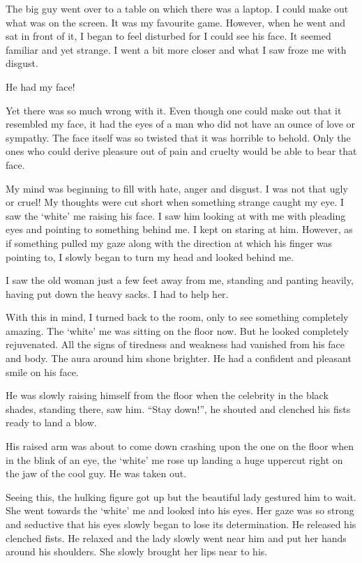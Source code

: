 \documentclass[twoside,11pt,titlepage]{article}
\begin{document}
The big guy went over to a table on which there was a laptop. I could make out what was on the screen. It was my favourite game. However, when he went and sat in front of it, I began to feel disturbed for I could see his face. It seemed familiar and yet strange. I went a bit more closer and what I saw froze me with disgust.

He had my face!

Yet there was so much wrong with it. Even though one could make out that it resembled my face, it had the eyes of a man who did not have an ounce of love or sympathy. The face itself was so twisted that it was horrible to behold. Only the ones who could derive pleasure out of pain and cruelty would be able to bear that face.

My mind was beginning to fill with hate, anger and disgust. I was not that ugly or cruel! My thoughts were cut short when something strange caught my eye. I saw the `white' me raising his face. I saw him looking at with me with pleading eyes and pointing to something behind me. I kept on staring at him. However, as if something pulled my gaze along with the direction at which his finger was pointing to, I slowly began to turn my head and looked behind me.

I saw the old woman just a few feet away from me, standing and panting heavily, having put down the heavy sacks. I had to help her.

With this in mind, I turned back to the room, only to see something completely amazing. The `white' me was sitting on the floor now. But he looked completely rejuvenated. All the signs of tiredness and weakness had vanished from his face and body. The aura around him shone brighter. He had a confident and pleasant smile on his face.

He was slowly raising himself from the floor when the celebrity in the black shades, standing there, saw him. ``Stay down!'', he shouted and clenched his fists ready to land a blow.

His raised arm was about to come down crashing upon the one on the floor when in the blink of an eye, the `white' me rose up landing a huge uppercut right on the jaw of the cool guy. He was taken out.

Seeing this, the hulking figure got up but the beautiful lady gestured him to wait. She went towards the `white' me and looked into his eyes. Her gaze was so strong and seductive that his eyes slowly began to lose its determination. He released his clenched fists. He relaxed and the lady slowly went near him and put her hands around his shoulders. She slowly brought her lips near to his.
\end{document}

